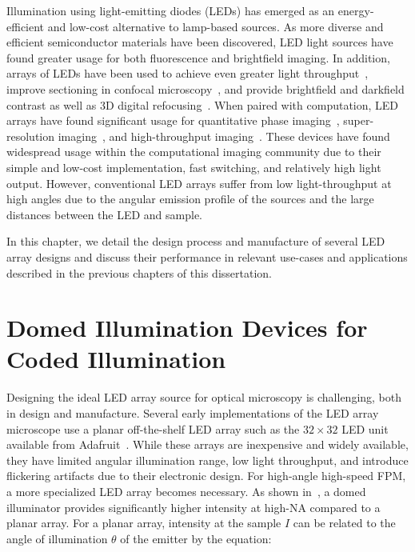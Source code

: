 Illumination using light-emitting diodes (LEDs) has emerged as an energy-efficient and low-cost alternative to lamp-based sources. As more diverse and efficient semiconductor materials have been discovered, LED light sources have found greater usage for both fluorescence and brightfield imaging. In addition, arrays of LEDs have been used to achieve even greater light throughput~\cite{albeanu2008led}, improve sectioning in confocal microscopy~\cite{poher2007optical}, and provide brightfield and darkfield contrast as well as 3D digital refocusing~\cite{Zheng2011}. When paired with computation, LED arrays have found significant usage for quantitative phase imaging~\cite{tian2015quantitative, phillips2015multi, chen2018quantitative}, super-resolution imaging~\cite{Zheng2013, Tian2014}, and high-throughput imaging~\cite{Ma:15}. These devices have found widespread usage within the computational imaging community due to their simple and low-cost implementation, fast switching, and relatively high light output. However, conventional LED arrays suffer from low light-throughput at high angles due to the angular emission profile of the sources and the large distances between the LED and sample.

In this chapter, we detail the design process and manufacture of several LED array designs and discuss their performance in relevant use-cases and applications described in the previous chapters of this dissertation.

\section{Domed Illumination Devices for Coded Illumination}

Designing the ideal LED array source for optical microscopy is challenging, both in design and manufacture. Several early implementations of the LED array microscope use a planar off-the-shelf LED array such as the $32\times 32$ LED unit available from Adafruit~\cite{Zheng2013, Zheng2011}. While these arrays are inexpensive and widely available, they have limited angular illumination range, low light throughput, and introduce flickering artifacts due to their electronic design. For high-angle high-speed FPM, a more specialized LED array becomes necessary. As shown in~\cite{phillips2015multi, Dominguez:14}, a domed illuminator provides significantly higher intensity at high-NA compared to a planar array. For a planar array, intensity at the sample $I$ can be related to the angle of illumination $\theta$ of the emitter by the equation:


